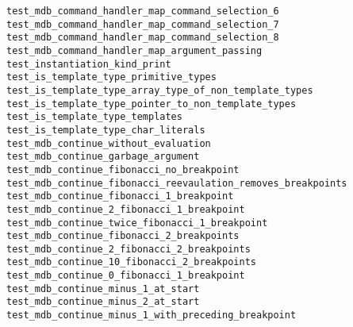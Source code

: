 \begin{description}
    \item[\texttt{test\_mdb\_command\_handler\_map\_command\_selection\_6}]
    \item[\texttt{test\_mdb\_command\_handler\_map\_command\_selection\_7}]
    \item[\texttt{test\_mdb\_command\_handler\_map\_command\_selection\_8}]
    \item[\texttt{test\_mdb\_command\_handler\_map\_argument\_passing}]
    \item[\texttt{test\_instantiation\_kind\_print}]
    \item[\texttt{test\_is\_template\_type\_primitive\_types}]
    \item[\texttt{test\_is\_template\_type\_array\_type\_of\_non\_template\_types}]
    \item[\texttt{test\_is\_template\_type\_pointer\_to\_non\_template\_types}]
    \item[\texttt{test\_is\_template\_type\_templates}]
    \item[\texttt{test\_is\_template\_type\_char\_literals}]
    \item[\texttt{test\_mdb\_continue\_without\_evaluation}]
    \item[\texttt{test\_mdb\_continue\_garbage\_argument}]
    \item[\texttt{test\_mdb\_continue\_fibonacci\_no\_breakpoint}]
    \item[\texttt{test\_mdb\_continue\_fibonacci\_reevaulation\_removes\_breakpoints}]
    \item[\texttt{test\_mdb\_continue\_fibonacci\_1\_breakpoint}]
    \item[\texttt{test\_mdb\_continue\_2\_fibonacci\_1\_breakpoint}]
    \item[\texttt{test\_mdb\_continue\_twice\_fibonacci\_1\_breakpoint}]
    \item[\texttt{test\_mdb\_continue\_fibonacci\_2\_breakpoints}]
    \item[\texttt{test\_mdb\_continue\_2\_fibonacci\_2\_breakpoints}]
    \item[\texttt{test\_mdb\_continue\_10\_fibonacci\_2\_breakpoints}]
    \item[\texttt{test\_mdb\_continue\_0\_fibonacci\_1\_breakpoint}]
    \item[\texttt{test\_mdb\_continue\_minus\_1\_at\_start}]
    \item[\texttt{test\_mdb\_continue\_minus\_2\_at\_start}]
    \item[\texttt{test\_mdb\_continue\_minus\_1\_with\_preceding\_breakpoint}]

\end{description}
